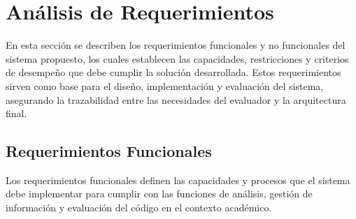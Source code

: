 \section{Análisis de Requerimientos}

En esta sección se describen los requerimientos funcionales y no funcionales del sistema propuesto, los cuales establecen las capacidades, restricciones y criterios de desempeño que debe cumplir la solución desarrollada. Estos requerimientos sirven como base para el diseño, implementación y evaluación del sistema, asegurando la trazabilidad entre las necesidades del evaluador y la arquitectura final.

\subsection{Requerimientos Funcionales}

Los requerimientos funcionales definen las capacidades y procesos que el sistema debe implementar para cumplir con las funciones de análisis, gestión de información y evaluación del código en el contexto académico.

